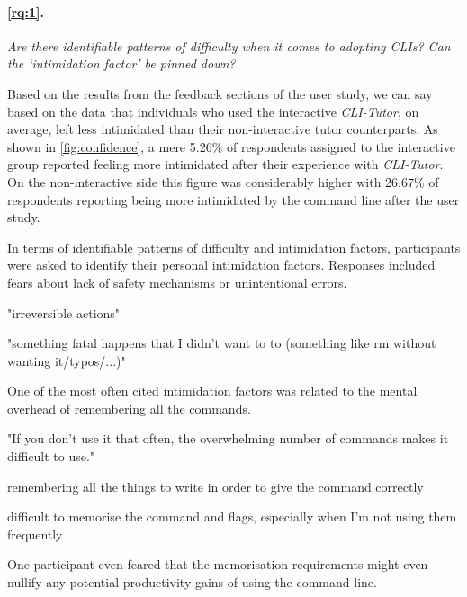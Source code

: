 \paragraph{\ref{rq:1}.} \textit{Are there identifiable patterns of difficulty when it comes to
	adopting CLIs? Can the `intimidation factor' be pinned down?}

Based on the results from the feedback sections of the user study, we can say
based on the data that individuals who used the interactive \textit{CLI-Tutor},
on average, left less intimidated than their non-interactive tutor
counterparts. As shown in \autoref{fig:confidence}, a mere 5.26\% of
respondents assigned to the interactive group reported feeling more intimidated
after their experience with \textit{CLI-Tutor}. On the non-interactive side
this figure was considerably higher with 26.67\% of respondents reporting
being more intimidated by the command line after the user study.

In terms of identifiable patterns of difficulty and intimidation factors,
participants were asked to identify their personal intimidation factors. Responses
included fears about lack of safety mechanisms or unintentional errors.

\begin{quotes}
	"irreversible actions"
\end{quotes}

\begin{quotes}
	"something fatal happens that I didn't want to to (something like rm without wanting it/typos/...)"
\end{quotes}

One of the most often cited intimidation factors was related to the mental overhead of remembering all the commands.
\begin{quotes}
	"If you don't use it that often, the overwhelming number of commands makes it difficult to use."
\end{quotes}

\begin{quotes}
	remembering all the things to write in order to give the command correctly
\end{quotes}

\begin{quotes}
	difficult to memorise the command and flags, especially when I'm not using them frequently
\end{quotes}

One participant even feared that the memorisation requirements might even
nullify any potential productivity gains of using the command line.

